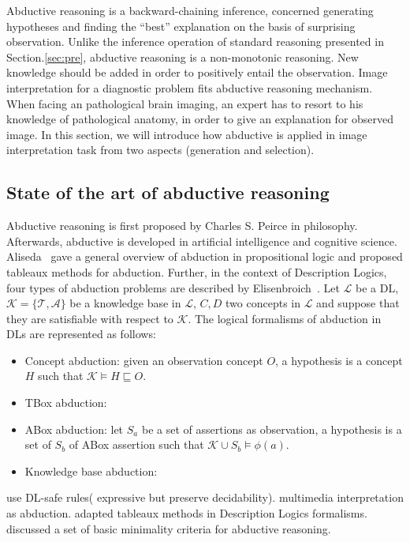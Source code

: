 \documentclass{article}
\begin{document}
Abductive reasoning is a backward-chaining inference, concerned generating hypotheses and finding the ``best'' explanation on the basis of surprising observation.
Unlike the inference operation of standard reasoning presented in Section.\ref{sec:pre}, abductive reasoning is a non-monotonic reasoning.
New knowledge should be added in order to positively entail the observation.
Image interpretation for a diagnostic problem fits abductive reasoning  mechanism.
When facing an pathological brain imaging, an expert has to resort to his knowledge of pathological anatomy, in order to give  an explanation for observed image. 
In this section, we will introduce how abductive is applied in image interpretation task from two aspects (generation and selection).

\subsection{State of the art of abductive reasoning}
Abductive reasoning is first proposed by Charles S. Peirce in philosophy.
Afterwards, abductive is developed in artificial intelligence and cognitive science.
Aliseda~\cite{aliseda1997seeking} gave a general overview of abduction in propositional logic and proposed tableaux methods for abduction.
Further, in the context of Description Logics, four types of abduction problems  are described by Elisenbroich~\cite{elsenbroich2006case}.
Let $\mathcal{L}$ be a DL, $\mathcal{K}=\{\mathcal{T},\mathcal{A}\}$ be a knowledge base in $\mathcal{L}$, $C,D$ two concepts in $\mathcal{L}$ and suppose that they are satisfiable
with respect to  $\mathcal{K}$.
The logical formalisms of abduction in DLs are represented as follows:
\begin{itemize}
 \item Concept abduction: given an observation concept $O$, a hypothesis is a concept $H$ such that $\mathcal{K}\vDash H \sqsubseteq O$.
 \item TBox abduction: 
 \item ABox abduction: let $S_a$ be a set of assertions as observation, a hypothesis is a set of $S_b$ of ABox assertion such that $\mathcal{K} \cup S_b\vDash \phi(a)$.
 \item Knowledge base abduction:
\end{itemize}


\cite{neumann2008scene} use DL-safe rules( expressive but preserve decidability).
\cite{shanahan2005perception} multimedia interpretation as abduction.
\cite{colucci2004uniform,di2009tableaux} adapted tableaux methods in Description Logics formalisms.
\cite{bienvenu08complexity} discussed a set of basic minimality criteria for abductive reasoning.
\cite{aliseda1997seeking,elsenbroich2006case,colucci2004uniform,di2009tableaux,klarman2011abox,halland2014tbox,gries2010probabilistic,du2011towards,du2014tractable,bienvenu08complexity}
\end{document}
